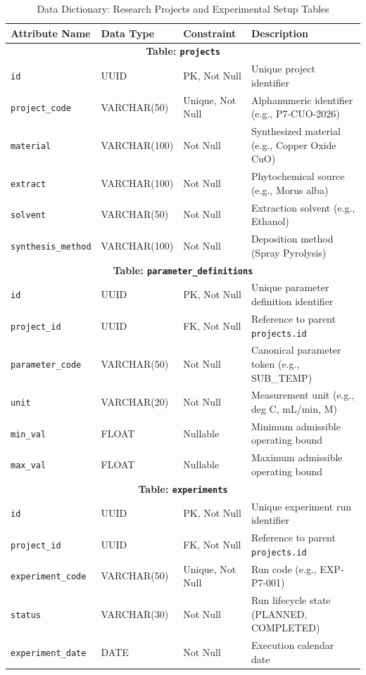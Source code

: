 \documentclass[12pt,a4paper,oneside]{report}
\begin{document}
{{{\begin{table}[!htbp]
\centering
\footnotesize
\setlength{\tabcolsep}{4pt}
\renewcommand{\arraystretch}{1.2}
\caption{Data Dictionary: Research Projects and Experimental Setup Tables}
\label{tab:dd_core}
\begin{tabular}{|p{3.7cm}|p{2.7cm}|p{2.5cm}|p{5.4cm}|}
\hline
\textbf{Attribute Name} & \textbf{Data Type} & \textbf{Constraint} & \textbf{Description} \\
\hline
\hline
\multicolumn{4}{|c|}{\textbf{Table: \texttt{projects}}} \\
\hline
\texttt{id} & UUID & PK, Not Null & Unique project identifier \\
\texttt{project\_code} & VARCHAR(50) & Unique, Not Null & Alphanumeric identifier (e.g., P7-CUO-2026) \\
\texttt{material} & VARCHAR(100) & Not Null & Synthesized material (e.g., Copper Oxide CuO) \\
\texttt{extract} & VARCHAR(100) & Not Null & Phytochemical source (e.g., Morus alba) \\
\texttt{solvent} & VARCHAR(50) & Not Null & Extraction solvent (e.g., Ethanol) \\
\texttt{synthesis\_method} & VARCHAR(100) & Not Null & Deposition method (Spray Pyrolysis) \\
\hline
\hline
\multicolumn{4}{|c|}{\textbf{Table: \texttt{parameter\_definitions}}} \\
\hline
\texttt{id} & UUID & PK, Not Null & Unique parameter definition identifier \\
\texttt{project\_id} & UUID & FK, Not Null & Reference to parent \texttt{projects.id} \\
\texttt{parameter\_code} & VARCHAR(50) & Not Null & Canonical parameter token (e.g., SUB\_TEMP) \\
\texttt{unit} & VARCHAR(20) & Not Null & Measurement unit (e.g., deg C, mL/min, M) \\
\texttt{min\_val} & FLOAT & Nullable & Minimum admissible operating bound \\
\texttt{max\_val} & FLOAT & Nullable & Maximum admissible operating bound \\
\hline
\hline
\multicolumn{4}{|c|}{\textbf{Table: \texttt{experiments}}} \\
\hline
\texttt{id} & UUID & PK, Not Null & Unique experiment run identifier \\
\texttt{project\_id} & UUID & FK, Not Null & Reference to parent \texttt{projects.id} \\
\texttt{experiment\_code} & VARCHAR(50) & Unique, Not Null & Run code (e.g., EXP-P7-001) \\
\texttt{status} & VARCHAR(30) & Not Null & Run lifecycle state (PLANNED, COMPLETED) \\
\texttt{experiment\_date} & DATE & Not Null & Execution calendar date \\
\hline
\end{tabular}
\end{table}

}}}
\end{document}
